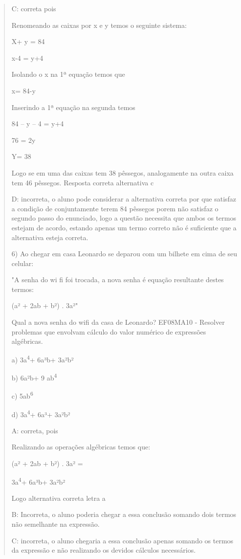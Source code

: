 \begin{quote}
\begin{escolha}
C: correta pois

Renomeando as caixas por x e y temos o seguinte sistema:

X+ y = 84

x-4 = y+4

Isolando o x na 1ª equação temos que

x= 84-y

Inserindo a 1ª equação na segunda temos

84 -- y -- 4 = y+4

76 = 2y

Y= 38

Logo se em uma das caixas tem 38 pêssegos, analogamente na outra caixa
tem 46 pêssegos. Resposta correta alternativa c

D: incorreta, o aluno pode considerar a alternativa correta por que
satisfaz a condição de conjuntamente terem 84 pêssegos porem não
satisfaz o segundo passo do enunciado, logo a questão necessita que
ambos os termos estejam de acordo, estando apenas um termo correto não é
suficiente que a alternativa esteja correta.

6) Ao chegar em casa Leonardo se deparou com um bilhete em cima de seu
celular:

"A senha do wi fi foi trocada, a nova senha é equação resultante destes
termos:

(a² + 2ab + b²) . 3a²"

Qual a nova senha do wifi da casa de Leonardo? EF08MA10 - Resolver
problemas que envolvam cálculo do valor numérico de expressões
algébricas.

a) 3a\textsuperscript{4}+ 6a³b+ 3a²b²

b) 6a²b+ 9 ab\textsuperscript{4}

c) 5ab\textsuperscript{6}

d) 3a\textsuperscript{4}+ 6a³+ 3a²b²

A: correta, pois

Realizando as operações algébricas temos que:

(a² + 2ab + b²) . 3a² =

3a\textsuperscript{4}+ 6a³b+ 3a²b²

Logo alternativa correta letra a

B: Incorreta, o aluno poderia chegar a essa conclusão somando dois
termos não semelhante na expressão.

C: incorreta, o aluno chegaria a essa conclusão apenas somando os termos
da expressão e não realizando os devidos cálculos necessários.


\end{escolha}
\end{quote}
